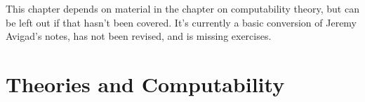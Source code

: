 \documentclass[../../../include/open-logic-chapter]{subfiles}
\begin{document}
\begin{editorial}
  This chapter depends on material in the chapter on computability
  theory, but can be left out if that hasn't been covered.  It's
  currently a basic conversion of Jeremy Avigad's notes, has not been
  revised, and is missing exercises.
\end{editorial}

\chapter{Theories and Computability}











\OLEndChapterHook
\end{document}
